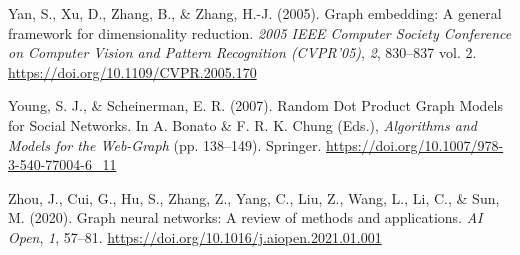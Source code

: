 \documentclass[10pt,oneside]{article}
\newlength{\cslhangindent}
\newenvironment{CSLReferences}[2] %
 {%
  \setlength{\parindent}{0pt}
  \ifodd #1 \everypar{\setlength{\hangindent}{\cslhangindent}}\ignorespaces\fi
  \ifnum #2 > 0
  \setlength{\parskip}{#2\baselineskip}
  \fi
 }%
 {}
\begin{document}
\begin{CSLReferences}{1}{0}
\leavevmode{}%
Yan, S., Xu, D., Zhang, B., \& Zhang, H.-J. (2005). Graph embedding: A
general framework for dimensionality reduction. \emph{2005 IEEE Computer
Society Conference on Computer Vision and Pattern Recognition
(CVPR'05)}, \emph{2}, 830--837 vol. 2.
\url{https://doi.org/10.1109/CVPR.2005.170}

\leavevmode{}%
Young, S. J., \& Scheinerman, E. R. (2007). Random Dot Product Graph
Models for Social Networks. In A. Bonato \& F. R. K. Chung (Eds.),
\emph{Algorithms and Models for the Web-Graph} (pp. 138--149). Springer.
\url{https://doi.org/10.1007/978-3-540-77004-6_11}

\leavevmode{}%
Zhou, J., Cui, G., Hu, S., Zhang, Z., Yang, C., Liu, Z., Wang, L., Li,
C., \& Sun, M. (2020). Graph neural networks: A review of methods and
applications. \emph{AI Open}, \emph{1}, 57--81.
\url{https://doi.org/10.1016/j.aiopen.2021.01.001}

\end{CSLReferences}
\end{document}
